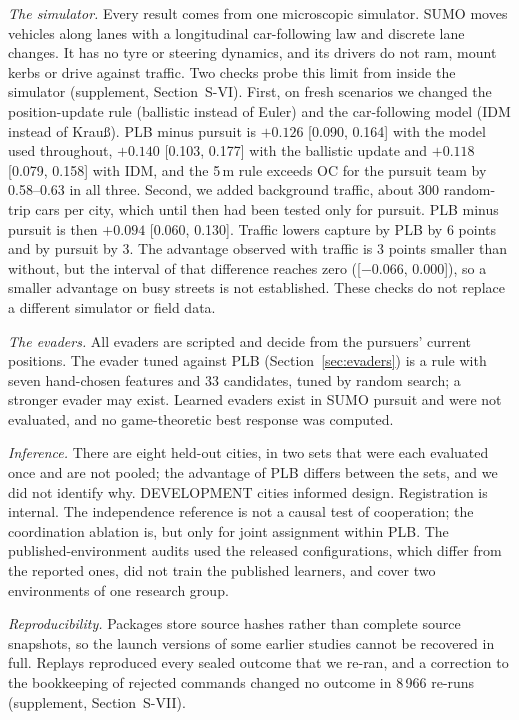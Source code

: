 \documentclass[5p,twocolumn]{elsarticle}
\begin{document}
\emph{The simulator.} Every result comes from one microscopic simulator. SUMO moves vehicles along lanes with a
longitudinal car-following law and discrete lane changes. It has no tyre or steering dynamics, and its drivers do not
ram, mount kerbs or drive against traffic. Two checks probe this limit from inside the simulator (supplement,
Section~S-VI). First, on fresh scenarios we changed the position-update rule (ballistic instead of Euler) and the
car-following model (IDM instead of Krau{\ss}). PLB minus pursuit is $+0.126$ [0.090, 0.164] with the model used
throughout, $+0.140$ [0.103, 0.177] with the ballistic update and $+0.118$ [0.079, 0.158] with IDM, and the 5\,m rule
exceeds OC for the pursuit team by 0.58--0.63 in all three. Second, we added background traffic, about 300 random-trip
cars per city, which until then had been tested only for pursuit. PLB minus pursuit is then $+0.094$ [0.060, 0.130].
Traffic lowers capture by PLB by 6 points and by pursuit by 3. The advantage observed with traffic is 3 points
smaller than without, but the interval of that difference reaches zero ([$-$0.066, 0.000]), so a smaller advantage on
busy streets is not established. These checks do not replace a different simulator or field data.

\emph{The evaders.} All evaders are scripted and decide from the pursuers' current positions. The evader tuned
against PLB (Section~\ref{sec:evaders}) is a rule with seven hand-chosen features and 33 candidates, tuned by random
search; a stronger evader may exist. Learned evaders exist in SUMO pursuit \cite{wang2022opponent} and were not
evaluated, and no game-theoretic best response was computed.

\emph{Inference.} There are eight held-out cities, in two sets that were each evaluated once and are not pooled;
the advantage of PLB differs between the sets, and we did not identify why. DEVELOPMENT cities informed design.
Registration is internal. The independence reference is not a causal test of cooperation; the coordination ablation
is, but only for joint assignment within PLB. The published-environment audits used the released configurations,
which differ from the reported ones, did not train the published learners, and cover two environments of one
research group.

\emph{Reproducibility.} Packages store source hashes rather than complete source snapshots, so the launch versions of
some earlier studies cannot be recovered in full. Replays reproduced every sealed outcome that we re-ran, and a
correction to the bookkeeping of rejected commands changed no outcome in 8\,966 re-runs (supplement,
Section~S-VII).
\end{document}
